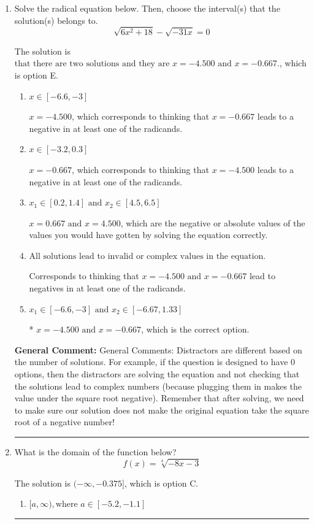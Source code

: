 \documentclass{extbook}[14pt]
\newcommand{\litem}[1]{\item #1

\rule{\textwidth}{0.4pt}}
\begin{document}
\begin{enumerate}\litem{
Solve the radical equation below. Then, choose the interval(s) that the solution(s) belongs to.
\[ \sqrt{6 x^2 + 18} - \sqrt{-31 x} = 0 \]

The solution is \( \text{that there are two solutions and they are } x = -4.500 \text{ and } x = -0.667. \), which is option E.\begin{enumerate}[label=\Alph*.]
\item \( x \in [-6.6,-3] \)

$x = -4.500$, which corresponds to thinking that $x = -0.667$ leads to a negative in at least one of the radicands.
\item \( x \in [-3.2,0.3] \)

$x = -0.667$, which corresponds to thinking that $x = -4.500$ leads to a negative in at least one of the radicands.
\item \( x_1 \in [0.2, 1.4] \text{ and } x_2 \in [4.5,6.5] \)

$x = 0.667 \text{ and } x = 4.500$, which are the negative or absolute values of the values you would have gotten by solving the equation correctly.
\item \( \text{All solutions lead to invalid or complex values in the equation.} \)

Corresponds to thinking that $x = -4.500 \text{ and } x = -0.667$ lead to negatives in at least one of the radicands.
\item \( x_1 \in [-6.6, -3] \text{ and } x_2 \in [-6.67,1.33] \)

* $x = -4.500 \text{ and } x = -0.667$, which is the correct option.
\end{enumerate}

\textbf{General Comment:} General Comments: Distractors are different based on the number of solutions. For example, if the question is designed to have 0 options, then the distractors are solving the equation and not checking that the solutions lead to complex numbers (because plugging them in makes the value under the square root negative). Remember that after solving, we need to make sure our solution does not make the original equation take the square root of a negative number!
}
\litem{
What is the domain of the function below?
\[ f(x) = \sqrt[4]{-8 x - 3} \]

The solution is \( (-\infty, -0.375] \), which is option C.\begin{enumerate}[label=\Alph*.]
\item \( [a, \infty), \text{where } a \in [-5.2, -1.1] \)


\end{enumerate}}
\end{enumerate}
\end{document}
